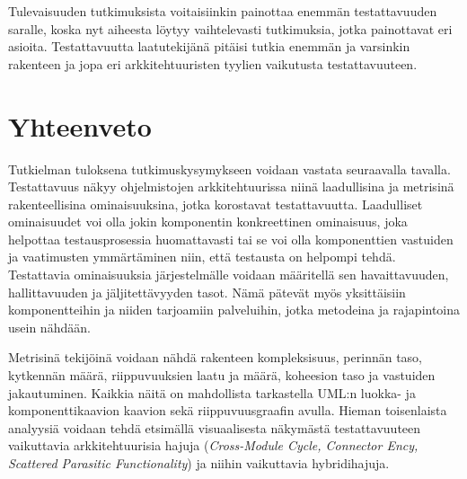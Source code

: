 \documentclass[finnish]{tktltiki2}
\numberwithin{table}{section}
\theoremstyle{definition}
\theoremstyle{remark}
\begin{document}
Tulevaisuuden tutkimuksista voitaisiinkin painottaa enemmän testattavuuden saralle, koska nyt aiheesta löytyy vaihtelevasti tutkimuksia, jotka painottavat eri asioita. Testattavuutta laatutekijänä pitäisi tutkia enemmän ja varsinkin rakenteen ja jopa eri arkkitehtuuristen tyylien vaikutusta testattavuuteen. 




\section{Yhteenveto}


Tutkielman tuloksena tutkimuskysymykseen voidaan vastata seuraavalla tavalla. Testattavuus näkyy ohjelmistojen arkkitehtuurissa niinä laadullisina ja metrisinä rakenteellisina ominaisuuksina, jotka korostavat testattavuutta. Laadulliset ominaisuudet voi olla jokin komponentin konkreettinen ominaisuus, joka helpottaa testausprosessia huomattavasti tai se voi olla komponenttien vastuiden ja vaatimusten ymmärtäminen niin, että testausta on helpompi tehdä. Testattavia ominaisuuksia järjestelmälle voidaan määritellä sen havaittavuuden, hallittavuuden ja jäljitettävyyden tasot. Nämä pätevät myös yksittäisiin komponentteihin ja niiden tarjoamiin palveluihin, jotka metodeina ja rajapintoina usein nähdään.

Metrisinä tekijöinä voidaan nähdä rakenteen kompleksisuus, perinnän taso, kytkennän määrä, riippuvuuksien laatu ja määrä, koheesion taso ja vastuiden jakautuminen. Kaikkia näitä on mahdollista tarkastella UML:n luokka- ja komponenttikaavion kaavion sekä riippuvuusgraafin avulla. Hieman toisenlaista analyysiä voidaan tehdä etsimällä visuaalisesta näkymästä testattavuuteen vaikuttavia arkkitehtuurisia hajuja (\textit{Cross-Module Cycle, Connector Ency, Scattered Parasitic Functionality}) ja niihin vaikuttavia hybridihajuja. 
\end{document}
